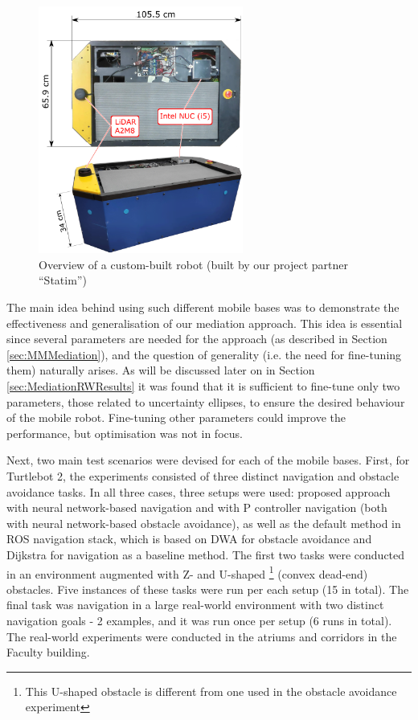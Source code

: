 \begin{figure}
\centering
\includegraphics[width=0.6\textwidth]{slike/paletar.png}
\caption[Overview of a custom-built robot]{Overview of a custom-built robot (built by our project partner ``Statim'')}
\label{Fig:paletarCombo}
\end{figure}

The main idea behind using such different mobile bases was to demonstrate the effectiveness and generalisation of our mediation approach. This idea is essential since several parameters are needed for the approach (as described in Section \ref{sec:MMMediation}), and the question of generality (i.e. the need for fine-tuning them) naturally arises. As will be discussed later on in Section \ref{sec:MediationRWResults} it was found that it is sufficient to fine-tune only two parameters, those related to uncertainty ellipses, to ensure the desired behaviour of the mobile robot. Fine-tuning other parameters could improve the performance, but optimisation was not in focus.

Next, two main test scenarios were devised for each of the mobile bases. First, for Turtlebot 2, the experiments consisted of three distinct navigation and obstacle avoidance tasks. In all three cases, three setups were used: proposed approach with neural network-based navigation and with P controller navigation (both with neural network-based obstacle avoidance), as well as the default method in ROS navigation stack, which is based on DWA for obstacle avoidance and Dijkstra for navigation as a baseline method. The first two tasks were conducted in an environment augmented with Z- and U-shaped \footnote{This U-shaped obstacle is different from one used in the obstacle avoidance experiment} (convex dead-end) obstacles. Five instances of these tasks were run per each setup (15 in total). The final task was navigation in a large real-world environment with two distinct navigation goals - 2 examples, and it was run once per setup (6 runs in total). The real-world experiments were conducted in the atriums and corridors in the Faculty building.

